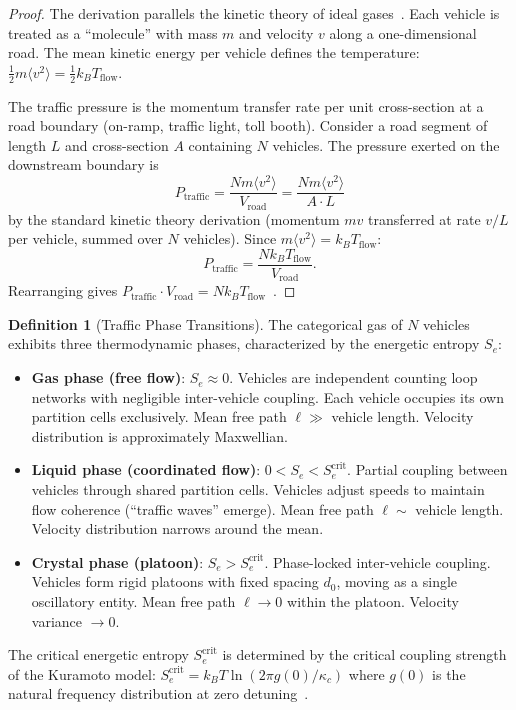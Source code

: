 \documentclass[twocolumn,10pt]{article}
\theoremstyle{definition}
\newtheorem{definition}[theorem]{Definition}
\newcommand{\Se}{S_e}
\begin{document}
\begin{proof}
The derivation parallels the kinetic theory of ideal gases~\cite{boltzmann1896,sachikonye2026gas}. Each vehicle is treated as a ``molecule'' with mass $m$ and velocity $v$ along a one-dimensional road. The mean kinetic energy per vehicle defines the temperature: $\frac{1}{2}m\langle v^2 \rangle = \frac{1}{2}k_B T_{\mathrm{flow}}$.

The traffic pressure is the momentum transfer rate per unit cross-section at a road boundary (on-ramp, traffic light, toll booth). Consider a road segment of length $L$ and cross-section $A$ containing $N$ vehicles. The pressure exerted on the downstream boundary is
\[
P_{\mathrm{traffic}} = \frac{N m \langle v^2 \rangle}{V_{\mathrm{road}}} = \frac{N m \langle v^2 \rangle}{A \cdot L}
\]
by the standard kinetic theory derivation (momentum $mv$ transferred at rate $v/L$ per vehicle, summed over $N$ vehicles). Since $m\langle v^2 \rangle = k_B T_{\mathrm{flow}}$:
\[
P_{\mathrm{traffic}} = \frac{N k_B T_{\mathrm{flow}}}{V_{\mathrm{road}}}.
\]
Rearranging gives $P_{\mathrm{traffic}} \cdot V_{\mathrm{road}} = N k_B T_{\mathrm{flow}}$~\cite{sachikonye2026equations}.
\end{proof}

\begin{definition}[Traffic Phase Transitions]
\label{def:traffic-phases}
The categorical gas of $N$ vehicles exhibits three thermodynamic phases, characterized by the energetic entropy $\Se$:
\begin{itemize}[leftmargin=*]
\item \textbf{Gas phase (free flow)}: $\Se \approx 0$. Vehicles are independent counting loop networks with negligible inter-vehicle coupling. Each vehicle occupies its own partition cells exclusively. Mean free path $\ell \gg$ vehicle length. Velocity distribution is approximately Maxwellian.

\item \textbf{Liquid phase (coordinated flow)}: $0 < \Se < \Se^{\mathrm{crit}}$. Partial coupling between vehicles through shared partition cells. Vehicles adjust speeds to maintain flow coherence (``traffic waves'' emerge). Mean free path $\ell \sim$ vehicle length. Velocity distribution narrows around the mean.

\item \textbf{Crystal phase (platoon)}: $\Se > \Se^{\mathrm{crit}}$. Phase-locked inter-vehicle coupling. Vehicles form rigid platoons with fixed spacing $d_0$, moving as a single oscillatory entity. Mean free path $\ell \to 0$ within the platoon. Velocity variance $\to 0$.
\end{itemize}
The critical energetic entropy $\Se^{\mathrm{crit}}$ is determined by the critical coupling strength of the Kuramoto model: $\Se^{\mathrm{crit}} = k_B T \ln(2\pi g(0)/\kappa_c)$ where $g(0)$ is the natural frequency distribution at zero detuning~\cite{kuramoto1984}.
\end{definition}
\end{document}
